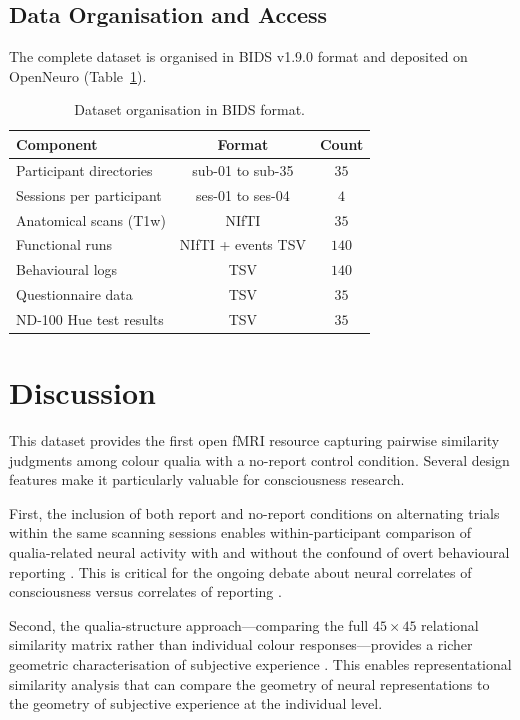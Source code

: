 \documentclass[11pt]{article}
\begin{document}
\subsection{Data Organisation and Access}

The complete dataset is organised in BIDS v1.9.0 format \citep{gorgolewski2016brain} and deposited on OpenNeuro (Table~\ref{tab:bids}).

\begin{table}[H]
\centering
\caption{Dataset organisation in BIDS format.}
\label{tab:bids}
\begin{tabular}{lcc}
\toprule
Component & Format & Count \\
\midrule
Participant directories & sub-01 to sub-35 & $35$ \\
Sessions per participant & ses-01 to ses-04 & $4$ \\
Anatomical scans (T1w) & NIfTI & $35$ \\
Functional runs & NIfTI + events TSV & $140$ \\
Behavioural logs & TSV & $140$ \\
Questionnaire data & TSV & $35$ \\
ND-100 Hue test results & TSV & $35$ \\
\bottomrule
\end{tabular}
\end{table}

\section{Discussion}

This dataset provides the first open fMRI resource capturing pairwise similarity judgments among colour qualia with a no-report control condition. Several design features make it particularly valuable for consciousness research.

First, the inclusion of both report and no-report conditions on alternating trials within the same scanning sessions enables within-participant comparison of qualia-related neural activity with and without the confound of overt behavioural reporting \citep{tsuchiya2015no}. This is critical for the ongoing debate about neural correlates of consciousness versus correlates of reporting \citep{koch2016neural, tononi2016integrated}.

Second, the qualia-structure approach---comparing the full $45 \times 45$ relational similarity matrix rather than individual colour responses---provides a richer geometric characterisation of subjective experience \citep{harada2020color, kriegeskorte2008rsa}. This enables representational similarity analysis that can compare the geometry of neural representations to the geometry of subjective experience at the individual level.
\end{document}
